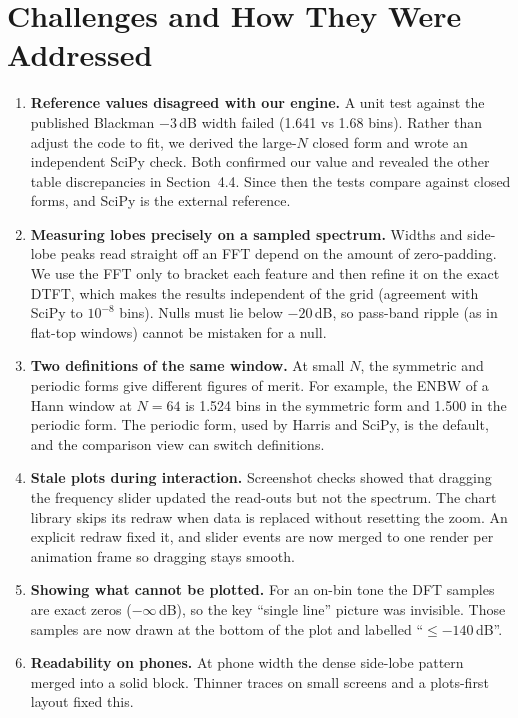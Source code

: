 \documentclass[11pt,a4paper]{article}
\begin{document}
\section{Challenges and How They Were Addressed}
\begin{enumerate}[leftmargin=1.4em]
  \item \textbf{Reference values disagreed with our engine.} A unit test against the published
        Blackman $-3$\,dB width failed (1.641 vs 1.68 bins). Rather than adjust the code to fit,
        we derived the large-$N$ closed form and wrote an independent SciPy check. Both confirmed
        our value and revealed the other table discrepancies in Section~4.4. Since then the tests
        compare against closed forms, and SciPy is the external reference.
  \item \textbf{Measuring lobes precisely on a sampled spectrum.} Widths and side-lobe peaks read
        straight off an FFT depend on the amount of zero-padding. We use the FFT only to bracket
        each feature and then refine it on the exact DTFT, which makes the results independent of
        the grid (agreement with SciPy to $10^{-8}$ bins). Nulls must lie below $-20$\,dB, so
        pass-band ripple (as in flat-top windows) cannot be mistaken for a null.
  \item \textbf{Two definitions of the same window.} At small $N$, the symmetric and periodic
        forms give different figures of merit. For example, the ENBW of a Hann window at $N=64$ is
        1.524 bins in the symmetric form and 1.500 in the periodic form. The periodic form, used
        by Harris and SciPy, is the default, and the comparison view can switch definitions.
  \item \textbf{Stale plots during interaction.} Screenshot checks showed that dragging the
        frequency slider updated the read-outs but not the spectrum. The chart library skips
        its redraw when data is replaced without resetting the zoom. An explicit redraw fixed it,
        and slider events are now merged to one render per animation frame so dragging stays smooth.
  \item \textbf{Showing what cannot be plotted.} For an on-bin tone the DFT samples are exact
        zeros ($-\infty$\,dB), so the key ``single line'' picture was invisible. Those samples
        are now drawn at the bottom of the plot and labelled ``$\le -140$\,dB''.
  \item \textbf{Readability on phones.} At phone width the dense side-lobe pattern merged into a
        solid block. Thinner traces on small screens and a plots-first layout fixed this.
\end{enumerate}
\end{document}
